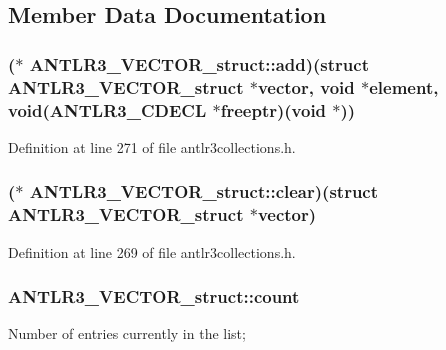 \subsection{Member Data Documentation}
\hypertarget{struct_a_n_t_l_r3___v_e_c_t_o_r__struct_a6f0dba3efc96ef4d8359833b16c54eae}{
\subsubsection[{add}]{($\ast$ A\-N\-T\-L\-R3\-\_\-\-V\-E\-C\-T\-O\-R\-\_\-struct\-::add)(struct {\bf A\-N\-T\-L\-R3\-\_\-\-V\-E\-C\-T\-O\-R\-\_\-struct} $\ast${\bf vector}, {\bf void} $\ast$element, {\bf void}({\bf A\-N\-T\-L\-R3\-\_\-\-C\-D\-E\-C\-L} $\ast$freeptr)({\bf void} $\ast$))}}\label{struct_a_n_t_l_r3___v_e_c_t_o_r__struct_a6f0dba3efc96ef4d8359833b16c54eae}


Definition at line 271 of file antlr3collections.\-h.

\hypertarget{struct_a_n_t_l_r3___v_e_c_t_o_r__struct_ac5a4bbeaf6f1c29f3174a8d6e4b73ab7}{
\subsubsection[{clear}]{($\ast$ A\-N\-T\-L\-R3\-\_\-\-V\-E\-C\-T\-O\-R\-\_\-struct\-::clear)(struct {\bf A\-N\-T\-L\-R3\-\_\-\-V\-E\-C\-T\-O\-R\-\_\-struct} $\ast${\bf vector})}}\label{struct_a_n_t_l_r3___v_e_c_t_o_r__struct_ac5a4bbeaf6f1c29f3174a8d6e4b73ab7}


Definition at line 269 of file antlr3collections.\-h.

\hypertarget{struct_a_n_t_l_r3___v_e_c_t_o_r__struct_a2159aa5b605c317c00ab0089dc45a7e9}{
\subsubsection[{count}]{ A\-N\-T\-L\-R3\-\_\-\-V\-E\-C\-T\-O\-R\-\_\-struct\-::count}}\label{struct_a_n_t_l_r3___v_e_c_t_o_r__struct_a2159aa5b605c317c00ab0089dc45a7e9}
Number of entries currently in the list; 

